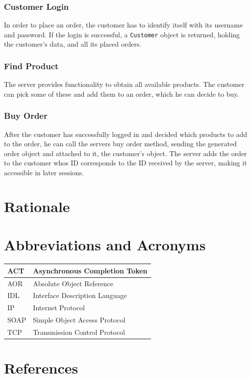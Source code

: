 \documentclass[a4paper]{article}
\begin{document}
\subsubsection{Customer Login}
In order to place an order, the customer has to identify itself with its username and password. If the login is successful, a \texttt{Customer} object is returned, holding the customer's data, and all its placed orders.

\subsubsection{Find Product}
The server provides functionality to obtain all available products. The customer can pick some of these and add them to an order, which he can decide to buy.

\subsubsection{Buy Order}
After the customer has successfully logged in and decided which products to add to the order, he can call the servers buy order method, sending the generated order object and attached to it, the customer's object. The server adds the order to the customer whos ID corresponds to the ID received by the server, making it accessible in later sessions.


\section{Rationale}


\clearpage
\appendix
\section{Abbreviations and Acronyms}
\vspace{0.5cm}
	\begin{tabular}{|l|l|}
	\hline
	ACT & Asynchronous Completion Token\\
	\hline
	AOR & Absolute Object Reference\\
	\hline
	IDL & Interface Description Language\\
	\hline
	IP & Internet Protocol\\
	\hline
	SOAP & Simple Object Access Protocol\\
	\hline
	TCP & Transmission Control Protocol\\
	\hline
	\end{tabular}

\vspace{1cm}

\section{References}
\renewcommand{\refname}{}
\vspace{-1cm}


\end{document}
